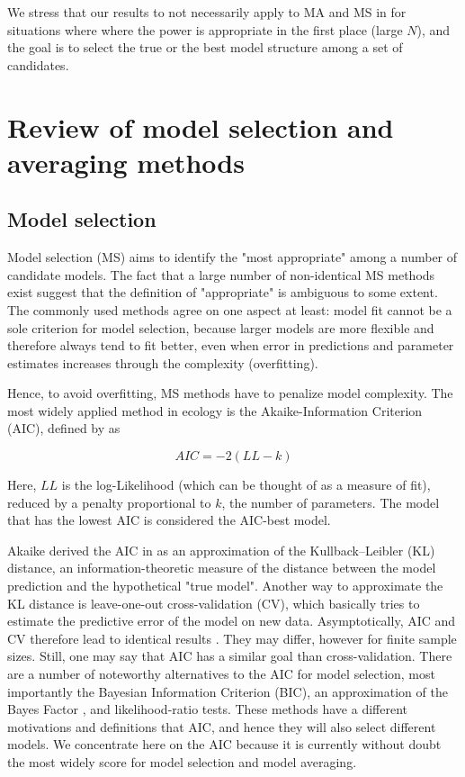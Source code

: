 \documentclass[5p]{elsarticle}
\begin{document}
We stress that our results to not necessarily apply to MA and MS in for situations where where the power is appropriate in the first place (large $N$), and the goal is to select the true or the best model structure among a set of candidates. 

\section{Review of model selection and averaging methods}

\subsection{Model selection}

Model selection (MS) aims to identify the "most appropriate" among a number of candidate models. The fact that a large number of non-identical MS methods exist suggest that the definition of "appropriate" is ambiguous to some extent. The commonly used methods agree on one aspect at least: model fit cannot be a sole criterion for model selection, because larger models are more flexible and therefore always tend to fit better, even when error in predictions and parameter estimates increases through the complexity (overfitting). 

Hence, to avoid overfitting, MS methods have to penalize model complexity. The most widely applied method in ecology is the Akaike-Information Criterion (AIC), defined by \citet{Akaike-NewLookAt-1974} as 

\begin{equation}
AIC = - 2 (LL - k) 
\label{eq: AIC}
\end{equation}

Here, $LL$ is the log-Likelihood (which can be thought of as a measure of fit), reduced by a penalty proportional to $k$, the number of parameters. The model that has the lowest AIC is considered the AIC-best model. 

Akaike derived the AIC in \citet{Akaike-NewLookAt-1974} as an approximation of the Kullback–Leibler (KL) distance, an information-theoretic measure of the distance between the model prediction and the hypothetical "true model". Another way to approximate the KL distance is leave-one-out cross-validation (CV), which basically tries to estimate the predictive error of the model on new data. Asymptotically, AIC and CV therefore lead to identical results \citep{Stone-AsymptoticEquivalenceChoice-1977}. They may differ, however for finite sample sizes. Still, one may say that AIC has a similar goal than cross-validation. There are a number of noteworthy alternatives to the AIC for model selection, most importantly the Bayesian Information Criterion (BIC), an approximation of the Bayes Factor \citep{Kass-BayesFactors-1995}, and likelihood-ratio tests. These methods have a different motivations and definitions that AIC, and hence they will also select different models. We concentrate here on the AIC because it is currently without doubt the most widely score for model selection and model averaging.
\end{document}
